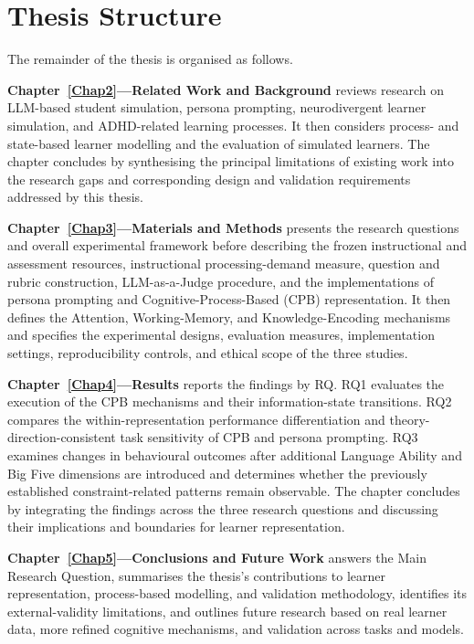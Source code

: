 \section{Thesis Structure}

The remainder of the thesis is organised as follows.

\textbf{Chapter~\ref{Chap2}---Related Work and Background} reviews research on LLM-based student simulation, persona prompting, neurodivergent learner simulation, and ADHD-related learning processes. It then considers process- and state-based learner modelling and the evaluation of simulated learners. The chapter concludes by synthesising the principal limitations of existing work into the research gaps and corresponding design and validation requirements addressed by this thesis.

\textbf{Chapter~\ref{Chap3}---Materials and Methods} presents the research questions and overall experimental framework before describing the frozen instructional and assessment resources, instructional processing-demand measure, question and rubric construction, LLM-as-a-Judge procedure, and the implementations of persona prompting and Cognitive-Process-Based (CPB) representation. It then defines the Attention, Working-Memory, and Knowledge-Encoding mechanisms and specifies the experimental designs, evaluation measures, implementation settings, reproducibility controls, and ethical scope of the three studies.

\textbf{Chapter~\ref{Chap4}---Results} reports the findings by RQ. RQ1 evaluates the execution of the CPB mechanisms and their information-state transitions. RQ2 compares the within-representation performance differentiation and theory-direction-consistent task sensitivity of CPB and persona prompting. RQ3 examines changes in behavioural outcomes after additional Language Ability and Big Five dimensions are introduced and determines whether the previously established constraint-related patterns remain observable. The chapter concludes by integrating the findings across the three research questions and discussing their implications and boundaries for learner representation.

\textbf{Chapter~\ref{Chap5}---Conclusions and Future Work} answers the Main Research Question, summarises the thesis's contributions to learner representation, process-based modelling, and validation methodology, identifies its external-validity limitations, and outlines future research based on real learner data, more refined cognitive mechanisms, and validation across tasks and models.
